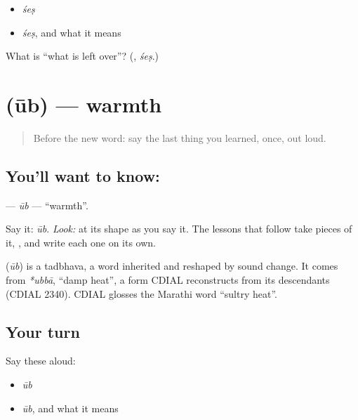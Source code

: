 \begin{itemize}
\raggedright
  \item \emph{śeṣ}
  \item \emph{śeṣ}, and what it means
\end{itemize}

\begin{tcolorbox}[breakable,colback=teal!4,colframe=teal!35!black,title={Before you move on}]
What is \textquotedblleft{}what is left over\textquotedblright{}? (\textbf{}, \emph{śeṣ}.)
\end{tcolorbox}
\section[\texorpdfstring{\mr{ऊब} (ūb)}{ऊब (ūb)}]{ (ūb) — warmth}

\label{lesson:MR-C08-uub}



\begin{quote}
Before the new word: say the last thing you learned, once, out loud.
\end{quote}

\subsection*{You'll want to know: }
\textbf{} — \emph{ūb} — \textquotedblleft{}warmth\textquotedblright{}.

Say it: \emph{ūb}. \emph{Look:} at its shape as you say it. The lessons that follow take pieces of it, \textbf{}, and write each one on its own.

\begin{cousinweb}
\textbf{} (\emph{ūb}) is a tadbhava, a word inherited and reshaped by sound change. It comes from \emph{*ubbā}, \textquotedblleft{}damp heat\textquotedblright{}, a form CDIAL reconstructs from its descendants (CDIAL 2340). CDIAL glosses the Marathi word \textquotedblleft{}sultry heat\textquotedblright{}.
\end{cousinweb}

\subsection*{Your turn}
Say these aloud:

\begin{itemize}
\raggedright
  \item \emph{ūb}
  \item \emph{ūb}, and what it means
\end{itemize}

